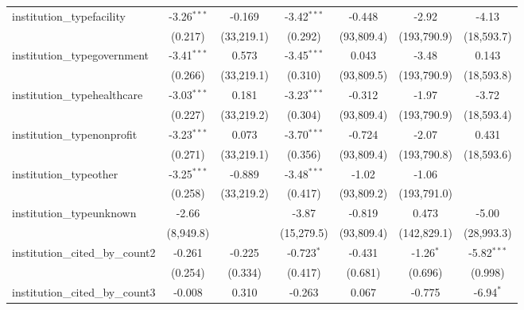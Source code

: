 \begin{tabular}{lcccccc}
   institution\_typefacility             & -3.26$^{***}$ & -0.169        & -3.42$^{***}$ & -0.448        & -2.92        & -4.13\\   
                                         & (0.217)       & (33,219.1)    & (0.292)       & (93,809.4)    & (193,790.9)  & (18,593.7)\\   
   institution\_typegovernment           & -3.41$^{***}$ & 0.573         & -3.45$^{***}$ & 0.043         & -3.48        & 0.143\\   
                                         & (0.266)       & (33,219.1)    & (0.310)       & (93,809.5)    & (193,790.9)  & (18,593.8)\\   
   institution\_typehealthcare           & -3.03$^{***}$ & 0.181         & -3.23$^{***}$ & -0.312        & -1.97        & -3.72\\   
                                         & (0.227)       & (33,219.2)    & (0.304)       & (93,809.4)    & (193,790.9)  & (18,593.4)\\   
   institution\_typenonprofit            & -3.23$^{***}$ & 0.073         & -3.70$^{***}$ & -0.724        & -2.07        & 0.431\\   
                                         & (0.271)       & (33,219.1)    & (0.356)       & (93,809.4)    & (193,790.8)  & (18,593.6)\\   
   institution\_typeother                & -3.25$^{***}$ & -0.889        & -3.48$^{***}$ & -1.02         & -1.06        &   \\   
                                         & (0.258)       & (33,219.2)    & (0.417)       & (93,809.2)    & (193,791.0)  &   \\   
   institution\_typeunknown              & -2.66         &               & -3.87         & -0.819        & 0.473        & -5.00\\   
                                         & (8,949.8)     &               & (15,279.5)    & (93,809.4)    & (142,829.1)  & (28,993.3)\\   
   institution\_cited\_by\_count2        & -0.261        & -0.225        & -0.723$^{*}$  & -0.431        & -1.26$^{*}$  & -5.82$^{***}$\\   
                                         & (0.254)       & (0.334)       & (0.417)       & (0.681)       & (0.696)      & (0.998)\\   
   institution\_cited\_by\_count3        & -0.008        & 0.310         & -0.263        & 0.067         & -0.775       & -6.94$^{*}$\\   

\end{tabular}
